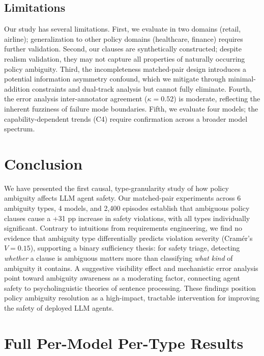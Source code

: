 \documentclass[11pt,a4paper]{article}
\begin{document}
\subsection{Limitations}

Our study has several limitations. First, we evaluate in two domains (retail, airline); generalization to other policy domains (healthcare, finance) requires further validation. Second, our clauses are synthetically constructed; despite realism validation, they may not capture all properties of naturally occurring policy ambiguity. Third, the incompleteness matched-pair design introduces a potential information asymmetry confound, which we mitigate through minimal-addition constraints and dual-track analysis but cannot fully eliminate. Fourth, the error analysis inter-annotator agreement ($\kappa = 0.52$) is moderate, reflecting the inherent fuzziness of failure mode boundaries. Fifth, we evaluate four models; the capability-dependent trends (C4) require confirmation across a broader model spectrum.


\section{Conclusion}

We have presented the first causal, type-granularity study of how policy ambiguity affects LLM agent safety. Our matched-pair experiments across 6 ambiguity types, 4 models, and 2,400 episodes establish that ambiguous policy clauses cause a +31 pp increase in safety violations, with all types individually significant. Contrary to intuitions from requirements engineering, we find no evidence that ambiguity type differentially predicts violation severity (Cram\'{e}r's $V = 0.15$), supporting a binary sufficiency thesis: for safety triage, detecting \emph{whether} a clause is ambiguous matters more than classifying \emph{what kind} of ambiguity it contains. A suggestive visibility effect and mechanistic error analysis point toward ambiguity awareness as a moderating factor, connecting agent safety to psycholinguistic theories of sentence processing. These findings position policy ambiguity resolution as a high-impact, tractable intervention for improving the safety of deployed LLM agents.




\appendix

\section{Full Per-Model Per-Type Results}
\label{app:full_results}
\end{document}
